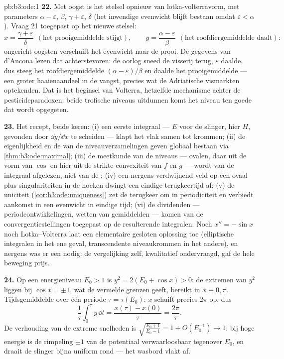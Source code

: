 \begin{solution}{pb:b3:ode:1}
\textbf{22.} Met oogst is het stelsel opnieuw van
lotka-volterravorm, met parameters $\alpha - \varepsilon$,
$\beta$, $\gamma + \varepsilon$, $\delta$ (het inwendige
evenwicht blijft bestaan omdat $\varepsilon < \alpha$). Vraag 21
toegepast op het nieuwe stelsel:
\[
\bar x = \frac{\gamma + \varepsilon}{\delta}
\ \ (\text{het prooigemiddelde stijgt}),
\qquad
\bar y = \frac{\alpha - \varepsilon}{\beta}
\ \ (\text{het roofdiergemiddelde daalt}) :
\]
ongericht oogsten verschuift het evenwicht naar de prooi. De
gegevens van d'Ancona lezen dat achterstevoren: de oorlog sneed
de visserij terug, $\varepsilon$ daalde, dus steeg het
roofdiergemiddelde $(\alpha - \varepsilon)/\beta$ en daalde het
prooigemiddelde --- een groter haaienaandeel in de vangst,
precies wat de Adriatische vismarkten optekenden. Dat is het
beginsel van Volterra, hetzelfde mechanisme achter de
pesticideparadoxen: beide trofische niveaus uitdunnen komt het
niveau ten goede dat wordt opgegeten.

\textbf{23.} Het recept, beide keren: (i) een eerste integraal
--- $E$ voor de slinger, hier $H$, gevonden door $\dd y/\dd x$ te
scheiden --- klapt het vlak samen tot krommen; (ii) de
eigenlijkheid en de  van de niveauverzamelingen geven
globaal bestaan via \cref{thm:b3:ode:maximal}; (iii) de
meetkunde van de niveaus --- ovalen, daar uit de vorm van $\cos$
en hier uit de strikte convexiteit van $f$ en $g$ --- wordt van
de integraal afgelezen, niet van de ; (iv) een nergens
verdwijnend veld op een  ovaal plus 
singulariteiten in de hoeken dwingt een eindige terugkeertijd af;
(v) de uniciteit (\cref{cor:b3:ode:uniqueness}) zet de terugkeer
om in periodiciteit en verbiedt aankomst in een evenwicht in
eindige tijd; (vi) de dividenden --- periodeontwikkelingen,
wetten van gemiddelden --- komen van de convergentiestellingen
toegepast op de resulterende integralen. Noch $x'' = -\sin x$
noch Lotka--Volterra laat een elementaire gesloten oplossing toe
(elliptische integralen in het ene geval, transcendente
niveaukrommen in het andere), en nergens was er een nodig: de
vergelijking zelf, kwalitatief ondervraagd, gaf de hele beweging
prijs.

\textbf{24.} Op een energieniveau $E_0 > 1$ is $y^2 = 2(E_0 +
\cos x) > 0$: de extremen van $y^2$ liggen bij $\cos x = \pm1$,
wat de vermelde grenzen geeft, bereikt in $x \equiv 0, \pi$.
Tijdsgemiddelde over één periode $\tau = \tau(E_0)$: $x$ schuift
precies $2\pi$ op, dus
\[
\frac1\tau\int_0^\tau y\,\dd t = \frac{x(\tau) -
x(0)}{\tau} = \frac{2\pi}\tau .
\]
De verhouding van de extreme snelheden is $\sqrt{\frac{E_0 +
1}{E_0 - 1}} = 1 + O(E_0^{-1}) \to 1$: bij hoge energie is de
rimpeling $\pm1$ van de potentiaal verwaarloosbaar tegenover
$E_0$, en draait de slinger bijna uniform rond --- het wasbord
vlakt af.


\end{solution}
